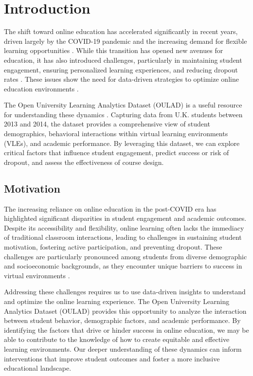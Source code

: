 \section*{Introduction}

The shift toward online education has accelerated significantly in recent years, driven largely by the COVID-19 pandemic and the increasing demand for flexible learning opportunities \cite{Dhawan2020, OECD2020}. While this transition has opened new avenues for education, it has also introduced challenges, particularly in maintaining student engagement, ensuring personalized learning experiences, and reducing dropout rates \cite{Kuh2007, Tinto2012}. These issues show the need for data-driven strategies to optimize online education environments \cite{Siemens2013}.

The Open University Learning Analytics Dataset (OULAD) is a useful resource for understanding these dynamics \cite{Kuzilek2017}. Capturing data from U.K. students between 2013 and 2014, the dataset provides a comprehensive view of student demographics, behavioral interactions within virtual learning environments (VLEs), and academic performance. By leveraging this dataset, we can explore critical factors that influence student engagement, predict success or risk of dropout, and assess the effectiveness of course design.

\subsection*{Motivation}

The increasing reliance on online education in the post-COVID era has highlighted significant disparities in student engagement and academic outcomes. Despite its accessibility and flexibility, online learning often lacks the immediacy of traditional classroom interactions, leading to challenges in sustaining student motivation, fostering active participation, and preventing dropout. These challenges are particularly pronounced among students from diverse demographic and socioeconomic backgrounds, as they encounter unique barriers to success in virtual environments \cite{Kuzilek2017}.

Addressing these challenges requires us to use data-driven insights to understand and optimize the online learning experience. The Open University Learning Analytics Dataset (OULAD) provides this opportunity to analyze the interaction between student behavior, demographic factors, and academic performance. By identifying the factors that drive or hinder success in online education, we may be able to contribute to the knowledge of how to create equitable and effective learning environments.  Our deeper understanding of these dynamics can inform interventions that improve student outcomes and foster a more inclusive educational landscape.


